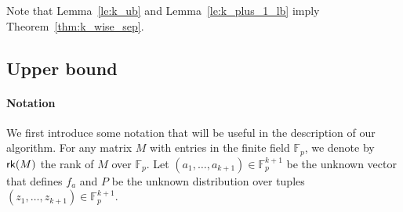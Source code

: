 Note that  Lemma~\ref{le:k_ub} and Lemma~\ref{le:k_plus_1_lb} imply Theorem~\ref{thm:k_wise_sep}.

\subsection{Upper bound}


\paragraph{Notation}
We first introduce some notation that will be useful in the description of our algorithm. For any matrix $M$ with entries in the finite field $\mathbb{F}_p$, we denote by $\mathsf{rk}(M)$ the rank of $M$ over $\mathbb{F}_p$. Let $(a_1,\dots,a_{k+1}) \in \mathbb{F}_p^{k+1}$ be the unknown vector that defines $f_a$ and $P$ be the unknown distribution over tuples $(z_1, \dots, z_{k+1}) \in \mathbb{F}_p^{k+1}$. 

